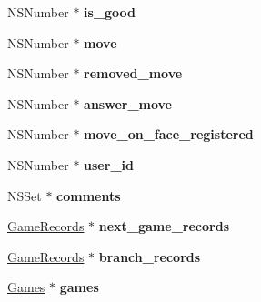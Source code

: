 \begin{DoxyCompactItemize}
\item 
\hypertarget{interface_game_records_ae50451bd19e25389aaa11b7b62eea995}{
NSNumber $\ast$ {\bfseries is\_\-good}}
\label{interface_game_records_ae50451bd19e25389aaa11b7b62eea995}

\item 
\hypertarget{interface_game_records_a9c655b3370357997e9f5fc60a9bd3a7c}{
NSNumber $\ast$ {\bfseries move}}
\label{interface_game_records_a9c655b3370357997e9f5fc60a9bd3a7c}

\item 
\hypertarget{interface_game_records_a1891a621b8d3addee60eaa57cc97669b}{
NSNumber $\ast$ {\bfseries removed\_\-move}}
\label{interface_game_records_a1891a621b8d3addee60eaa57cc97669b}

\item 
\hypertarget{interface_game_records_aa8c3d63ac5ffc94c6e609611077d05e6}{
NSNumber $\ast$ {\bfseries answer\_\-move}}
\label{interface_game_records_aa8c3d63ac5ffc94c6e609611077d05e6}

\item 
\hypertarget{interface_game_records_aee248296724ff88c12d0a634f44ba1c7}{
NSNumber $\ast$ {\bfseries move\_\-on\_\-face\_\-registered}}
\label{interface_game_records_aee248296724ff88c12d0a634f44ba1c7}

\item 
\hypertarget{interface_game_records_ac772364449252fb44da4c0e5f3103c18}{
NSNumber $\ast$ {\bfseries user\_\-id}}
\label{interface_game_records_ac772364449252fb44da4c0e5f3103c18}

\item 
\hypertarget{interface_game_records_a12340123ee4e82efcf132843ed5b9665}{
NSSet $\ast$ {\bfseries comments}}
\label{interface_game_records_a12340123ee4e82efcf132843ed5b9665}

\item 
\hypertarget{interface_game_records_ade53f94ec88e460f25619f62496205a8}{
\hyperlink{interface_game_records}{GameRecords} $\ast$ {\bfseries next\_\-game\_\-records}}
\label{interface_game_records_ade53f94ec88e460f25619f62496205a8}

\item 
\hypertarget{interface_game_records_a6edcd011b4bfa37e39be4af12e413fde}{
\hyperlink{interface_game_records}{GameRecords} $\ast$ {\bfseries branch\_\-records}}
\label{interface_game_records_a6edcd011b4bfa37e39be4af12e413fde}

\item 
\hypertarget{interface_game_records_ac6ac532e3c728095f9b339f303f0c81e}{
\hyperlink{interface_games}{Games} $\ast$ {\bfseries games}}
\label{interface_game_records_ac6ac532e3c728095f9b339f303f0c81e}


\end{DoxyCompactItemize}
